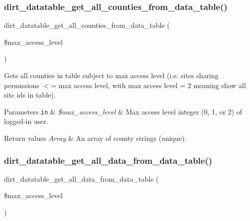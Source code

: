 \subsubsection{\texorpdfstring{dirt\+\_\+datatable\+\_\+get\+\_\+all\+\_\+counties\+\_\+from\+\_\+data\+\_\+table()}{dirt\_datatable\_get\_all\_counties\_from\_data\_table()}}
{\footnotesize\ttfamily dirt\+\_\+datatable\+\_\+get\+\_\+all\+\_\+counties\+\_\+from\+\_\+data\+\_\+table (\begin{DoxyParamCaption}\item[{}]{\$max\+\_\+access\+\_\+level }\end{DoxyParamCaption})}

Gets all counties in table subject to max access level (i.\+e. site\textquotesingle{}s sharing permissions $<$= max access level, with max access level = 2 meaning show all site ids in table).


\begin{DoxyParams}[1]{Parameters}
\mbox{\tt in}  & {\em \$max\+\_\+access\+\_\+level} & Max access level integer (0, 1, or 2) of logged-\/in user.\\
\hline
\end{DoxyParams}

\begin{DoxyRetVals}{Return values}
{\em Array} & An array of county strings (unique). \\
\hline
\end{DoxyRetVals}
\mbox{\label{dirt__datatable_8search__table__db__ops_8inc_ab27d8da10244a4377319b39414041ba4}} 
\subsubsection{\texorpdfstring{dirt\+\_\+datatable\+\_\+get\+\_\+all\+\_\+data\+\_\+from\+\_\+data\+\_\+table()}{dirt\_datatable\_get\_all\_data\_from\_data\_table()}}
{\footnotesize\ttfamily dirt\+\_\+datatable\+\_\+get\+\_\+all\+\_\+data\+\_\+from\+\_\+data\+\_\+table (\begin{DoxyParamCaption}\item[{}]{\$max\+\_\+access\+\_\+level }\end{DoxyParamCaption})}

